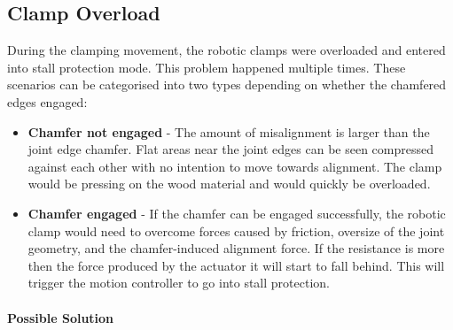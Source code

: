 \subsection{Clamp Overload}
\label{subsection:exploration-2-clamp-overload}

During the  clamping movement, the robotic clamps were overloaded and entered into stall protection mode. This problem happened multiple times. These scenarios can be categorised into two types depending on whether the chamfered edges engaged:

\begin{itemize}
    \item \textbf{Chamfer not engaged} - The amount of misalignment is larger than the joint edge chamfer. Flat areas near the joint edges can be seen compressed against each other with no intention to move towards alignment. The clamp would be pressing on the wood material and would quickly be overloaded.
    \item \textbf{Chamfer engaged} - If the chamfer can be engaged successfully, the robotic clamp would need to overcome forces caused by friction, oversize of the joint geometry, and the chamfer-induced alignment force. If the resistance is more then the force produced by the actuator it will start to fall behind. This will trigger the motion controller to go into stall protection.
\end{itemize}

\paragraph{Possible Solution}


